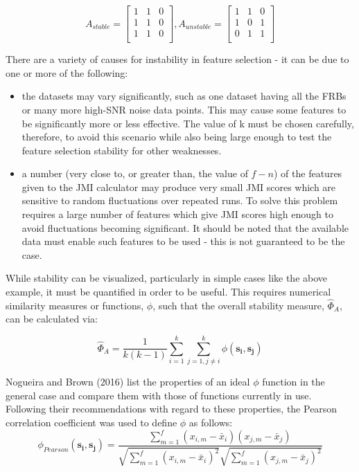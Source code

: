\documentclass[12pt]{article}
\renewcommand{\vec}[1]{\mathbf{#1}}
\begin{document}
 \[
A_{stable} =
  \begin{bmatrix}
    1 & 1 & 0 \\
    1 & 1 & 0 \\
    1 & 1 & 0 \\
  \end{bmatrix}
, A_{unstable} =
  \begin{bmatrix}
    1 & 1 & 0 \\
    1 & 0 & 1 \\
    0 & 1 & 1 \\
  \end{bmatrix}
\]

There are a variety of causes for instability in feature selection - it can be due to one or more of the following:
\begin{itemize}
\item the datasets may vary significantly, such as one dataset having all the FRBs or many more high-SNR noise data points. This may cause some features to be significantly more or less effective. The value of k must be chosen carefully, therefore, to avoid this scenario while also being large enough to test the feature selection stability for other weaknesses.

\item a number (very close to, or greater than, the value of $f-n$) of the features given to the JMI calculator may produce very small JMI scores which are sensitive to random fluctuations over repeated runs. To solve this problem requires a large number of features which give JMI scores high enough to avoid fluctuations becoming significant. It should be noted that the available data must enable such features to be used - this is not guaranteed to be the case.

\end{itemize}

While stability can be visualized, particularly in simple cases like the above example, it must be quantified in order to be useful. This requires numerical similarity measures or functions, $\phi$, such that the overall stability measure, $\hat{\Phi}_{A}$, can be calculated via:

\begin{equation}
\hat{\Phi}_{A} = \frac{1}{k(k-1)} \sum\limits_{i=1}^{k}\sum\limits_{j=1, j \neq i}^{k}\phi(\vec{s_{i}}, \vec{s_{j}})
\end{equation}

Nogueira and Brown (2016)\cite{nogueira2016measuring} list the properties of an ideal $\phi$ function in the general case and compare them with those of functions currently in use. Following their recommendations with regard to these properties, the Pearson correlation coefficient was used to define $\phi$ as follows:
\begin{equation}
\phi_{Pearson}(\vec{s_{i}}, \vec{s_{j}}) = \frac{\sum\limits_{m=1}^{f}(x_{i,m} - \bar{x}_{i})(x_{j,m} - \bar{x}_{j})}{\sqrt{\sum\limits_{m=1}^{f}(x_{i,m} - \bar{x}_{i})^{2}} \sqrt{\sum\limits_{m=1}^{f}(x_{j,m} - \bar{x}_{j})^{2}}}
\end{equation}
\end{document}
